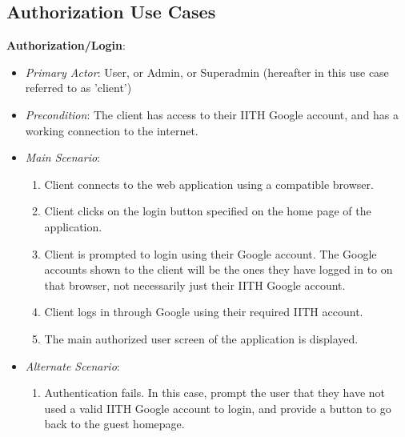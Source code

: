 \documentclass{article}
\begin{document}
\subsection{Authorization Use Cases}
\textbf{Authorization/Login}: 
\label{uclogin}
\begin{itemize}
    \item \textit{Primary Actor}: User, or Admin, or Superadmin (hereafter in this use case referred to as 'client') 
    \item \textit{Precondition}: The client has access to their IITH Google account, and has a working connection to the internet. %
    \item \textit{Main Scenario}:
    \begin{enumerate}
        \item Client connects to the web application using a compatible browser. 
        \item Client clicks on the login button specified on the home page of the application. 
        \item Client is prompted to login using their Google account. The Google accounts shown to the client will be the ones they have logged in to on that browser, not necessarily just their IITH Google account. 
        \item Client logs in through Google using their required IITH account.
        \item The main authorized user screen of the application is displayed. 
    \end{enumerate}
    \item \textit{Alternate Scenario}:
        \begin{enumerate}
            \item Authentication fails. In this case, prompt the user that they have not used a valid IITH Google account to login, and provide a button to go back to the guest homepage. 
        \end{enumerate}
\end{itemize}

\end{document}
